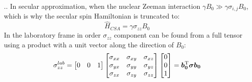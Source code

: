 \documentclass[handout]{beamer}
\begin{document}
\begin{frame}{\thesection.\thesubsection. \insertsubsection}
    In secular approximation, when the nuclear Zeeman interaction $\gamma B_0 \gg \gamma \sigma_{i,j} B_0$, which is why the secular spin Hamiltonian is truncated to:
    \begin{equation}
       \hat{H}_{CSA} = \gamma \sigma_{zz} B_0
    \end{equation}
    In the laboratory frame in order  $\sigma_{zz}$ component can be found from a full tensor using a product with a unit vector along the direction of $B_0$:
    \begin{equation} \label{eq:sigma_zz}
       \sigma_{zz}^{lab}= 
       \begin{bmatrix}
          0 & 0 & 1
       \end{bmatrix}       
      \begin{bmatrix}
      \sigma_{xx} & \sigma_{xy} & \sigma_{xz} \\
      \sigma_{yx} & \sigma_{yy} & \sigma_{yz} \\
      \sigma_{zx} & \sigma_{zy} & \sigma_{zz} \\
      \end{bmatrix}       
      \begin{bmatrix}
      0 \\
      0 \\
      1 \\
      \end{bmatrix} = \bm{b_0}^{\rm T} \bm{\sigma} \bm{b_0}
    \end{equation}
\end{frame}
\end{document}
